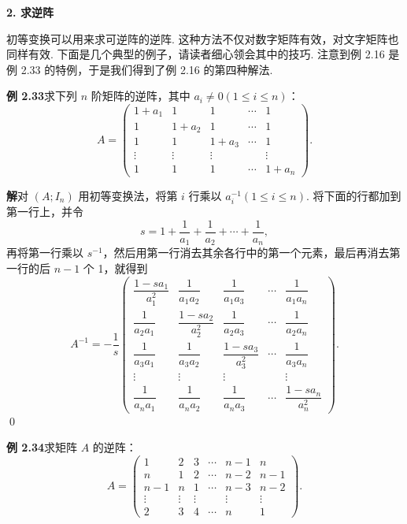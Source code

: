 \documentclass[UTF8,12pt,a4paper,fontset=fandol]{ctexart}
\begin{document}
\noindent\textbf{2. 求逆阵}

初等变换可以用来求可逆阵的逆阵. 这种方法不仅对数字矩阵有效，对文字矩阵也同样有效. 下面是几个典型的例子，请读者细心领会其中的技巧. 注意到例 2.16 是例 2.33 的特例，于是我们得到了例 2.16 的第四种解法.

\noindent\textbf{例 2.33}\quad 求下列 $n$ 阶矩阵的逆阵，其中 $a_i\ne0(1\le i\le n)$：
\[
A=
\left(
\begin{array}{ccccc}
1+a_1 & 1 & 1 & \cdots & 1\\
1 & 1+a_2 & 1 & \cdots & 1\\
1 & 1 & 1+a_3 & \cdots & 1\\
\vdots & \vdots & \vdots & & \vdots\\
1 & 1 & 1 & \cdots & 1+a_n
\end{array}
\right).
\]

\noindent\textbf{解}\quad 对 $(A;I_n)$ 用初等变换法，将第 $i$ 行乘以 $a_i^{-1}(1\le i\le n)$. 将下面的行都加到第一行上，并令
\[
s=1+\frac1{a_1}+\frac1{a_2}+\cdots+\frac1{a_n},
\]
再将第一行乘以 $s^{-1}$，然后用第一行消去其余各行中的第一个元素，最后再消去第一行的后 $n-1$ 个 1，就得到
\[
A^{-1}=-\frac1s
\left(
\begin{array}{ccccc}
\dfrac{1-sa_1}{a_1^2} & \dfrac1{a_1a_2} & \dfrac1{a_1a_3} & \cdots & \dfrac1{a_1a_n}\\
\dfrac1{a_2a_1} & \dfrac{1-sa_2}{a_2^2} & \dfrac1{a_2a_3} & \cdots & \dfrac1{a_2a_n}\\
\dfrac1{a_3a_1} & \dfrac1{a_3a_2} & \dfrac{1-sa_3}{a_3^2} & \cdots & \dfrac1{a_3a_n}\\
\vdots & \vdots & \vdots & & \vdots\\
\dfrac1{a_na_1} & \dfrac1{a_na_2} & \dfrac1{a_na_3} & \cdots & \dfrac{1-sa_n}{a_n^2}
\end{array}
\right).
\]
\qed

\noindent\textbf{例 2.34}\quad 求矩阵 $A$ 的逆阵：
\[
A=
\left(
\begin{array}{cccccc}
1 & 2 & 3 & \cdots & n-1 & n\\
n & 1 & 2 & \cdots & n-2 & n-1\\
n-1 & n & 1 & \cdots & n-3 & n-2\\
\vdots & \vdots & \vdots & & \vdots & \vdots\\
2 & 3 & 4 & \cdots & n & 1
\end{array}
\right).
\]
\end{document}
